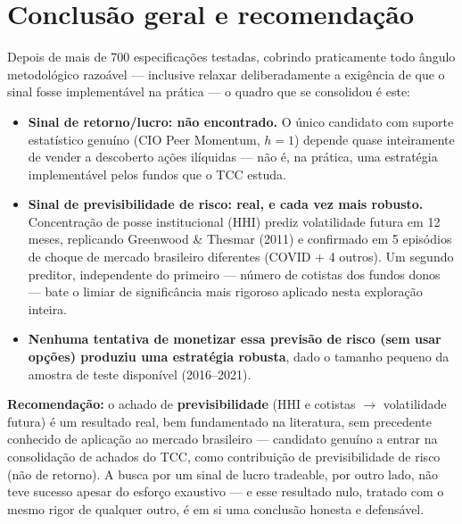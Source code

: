 \documentclass[11pt,a4paper]{article}
\begin{document}
\section{Conclusão geral e recomendação}

Depois de mais de 700 especificações testadas, cobrindo praticamente todo
ângulo metodológico razoável --- inclusive relaxar deliberadamente a
exigência de que o sinal fosse implementável na prática --- o quadro que
se consolidou é este:

\begin{itemize}
\item \textbf{Sinal de retorno/lucro: não encontrado.} O único candidato
com suporte estatístico genuíno (CIO Peer Momentum, $h=1$) depende quase
inteiramente de vender a descoberto ações ilíquidas --- não é, na prática,
uma estratégia implementável pelos fundos que o TCC estuda.
\item \textbf{Sinal de previsibilidade de risco: real, e cada vez mais
robusto.} Concentração de posse institucional (HHI) prediz volatilidade
futura em 12 meses, replicando Greenwood \& Thesmar (2011) e confirmado em
5 episódios de choque de mercado brasileiro diferentes (COVID + 4
outros). Um segundo preditor, independente do primeiro --- número de
cotistas dos fundos donos --- bate o limiar de significância mais
rigoroso aplicado nesta exploração inteira.
\item \textbf{Nenhuma tentativa de monetizar essa previsão de risco (sem
usar opções) produziu uma estratégia robusta}, dado o tamanho pequeno da
amostra de teste disponível (2016--2021).
\end{itemize}

\textbf{Recomendação:} o achado de \textbf{previsibilidade} (HHI e
cotistas $\to$ volatilidade futura) é um resultado real, bem fundamentado
na literatura, sem precedente conhecido de aplicação ao mercado
brasileiro --- candidato genuíno a entrar na consolidação de achados do
TCC, como contribuição de previsibilidade de risco (não de retorno). A
busca por um sinal de lucro tradeable, por outro lado, não teve sucesso
apesar do esforço exaustivo --- e esse resultado nulo, tratado com o mesmo
rigor de qualquer outro, é em si uma conclusão honesta e defensável.
\end{document}
